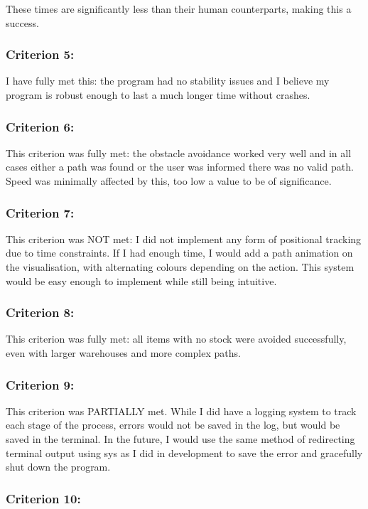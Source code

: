 These times are significantly less than their human counterparts, making this a success.

\subsubsection{Criterion 5:}

I have fully met this: the program had no stability issues and I believe my program is robust enough to last a much longer time without crashes.

\subsubsection{Criterion 6:}

This criterion was fully met: the obstacle avoidance worked very well and in all cases either a path was found or the user was informed there was no valid path. Speed was minimally affected by this, too low a value to be of significance.

\subsubsection{Criterion 7:}

This criterion was NOT met: I did not implement any form of positional tracking due to time constraints. If I had enough time, I would add a path animation on the visualisation, with alternating colours depending on the action. This system would be easy enough to implement while still being intuitive.

\subsubsection{Criterion 8:}
This criterion was fully met: all items with no stock were avoided successfully, even with larger warehouses and more complex paths.
\subsubsection{Criterion 9:}

This criterion was PARTIALLY met. While I did have a logging system to track each stage of the process, errors would not be saved in the log, but would be saved in the terminal. In the future, I would use the same method of redirecting terminal output using sys as I did in development to save the error and gracefully shut down the program.

\subsubsection{Criterion 10:}

